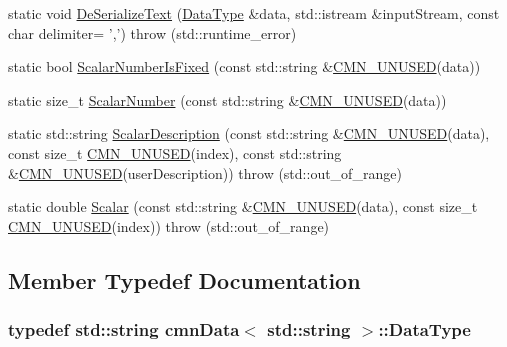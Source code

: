 \begin{DoxyCompactItemize}
\item 
static void \hyperlink{classcmn_data_3_01std_1_1string_01_4_a3b5d60a66380dc699478f034a97bf80d}{De\-Serialize\-Text} (\hyperlink{classcmn_data_3_01std_1_1string_01_4_a04ffa92a93dc010ed2bf5bf19e2d0fdd}{Data\-Type} \&data, std\-::istream \&input\-Stream, const char delimiter= ',')  throw (std\-::runtime\-\_\-error)
\item 
static bool \hyperlink{classcmn_data_3_01std_1_1string_01_4_a4439940c9caf6fa0c5aed5d7f1f67220}{Scalar\-Number\-Is\-Fixed} (const std\-::string \&\hyperlink{cmn_portability_8h_a021894e2626935fa2305434b1e893ff6}{C\-M\-N\-\_\-\-U\-N\-U\-S\-E\-D}(data))
\item 
static size\-\_\-t \hyperlink{classcmn_data_3_01std_1_1string_01_4_ac957913077f40ae21b4be6818adc177c}{Scalar\-Number} (const std\-::string \&\hyperlink{cmn_portability_8h_a021894e2626935fa2305434b1e893ff6}{C\-M\-N\-\_\-\-U\-N\-U\-S\-E\-D}(data))
\item 
static std\-::string \hyperlink{classcmn_data_3_01std_1_1string_01_4_a7c9969a22e74ef45544cd585df2a5dc3}{Scalar\-Description} (const std\-::string \&\hyperlink{cmn_portability_8h_a021894e2626935fa2305434b1e893ff6}{C\-M\-N\-\_\-\-U\-N\-U\-S\-E\-D}(data), const size\-\_\-t \hyperlink{cmn_portability_8h_a021894e2626935fa2305434b1e893ff6}{C\-M\-N\-\_\-\-U\-N\-U\-S\-E\-D}(index), const std\-::string \&\hyperlink{cmn_portability_8h_a021894e2626935fa2305434b1e893ff6}{C\-M\-N\-\_\-\-U\-N\-U\-S\-E\-D}(user\-Description))  throw (std\-::out\-\_\-of\-\_\-range)
\item 
static double \hyperlink{classcmn_data_3_01std_1_1string_01_4_ae03333be4482856cd9b51094c6611b28}{Scalar} (const std\-::string \&\hyperlink{cmn_portability_8h_a021894e2626935fa2305434b1e893ff6}{C\-M\-N\-\_\-\-U\-N\-U\-S\-E\-D}(data), const size\-\_\-t \hyperlink{cmn_portability_8h_a021894e2626935fa2305434b1e893ff6}{C\-M\-N\-\_\-\-U\-N\-U\-S\-E\-D}(index))  throw (std\-::out\-\_\-of\-\_\-range)
\end{DoxyCompactItemize}


\subsection{Member Typedef Documentation}
\hypertarget{classcmn_data_3_01std_1_1string_01_4_a04ffa92a93dc010ed2bf5bf19e2d0fdd}{
\subsubsection[{Data\-Type}]{\setlength{\rightskip}{0pt plus 5cm}typedef std\-::string {\bf cmn\-Data}$<$ std\-::string $>$\-::{\bf Data\-Type}}}\label{classcmn_data_3_01std_1_1string_01_4_a04ffa92a93dc010ed2bf5bf19e2d0fdd}


